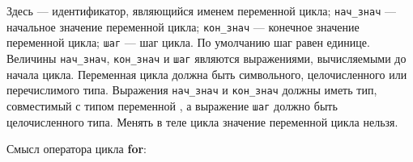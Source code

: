 \documentclass[10pt]{report}
\begin{document}
Здесь \textcolor{Green}{} --- идентификатор, являющийся именем переменной цикла; \texttt{нач_знач} --- начальное значение переменной цикла;
\texttt{кон_знач} --- конечное значение переменной цикла; \texttt{шаг} --- шаг цикла. По умолчанию шаг равен единице. Величины \texttt{нач_знач}, \texttt{кон_знач} и
\texttt{шаг} являются выражениями, вычисляемыми до начала цикла. Переменная цикла должна быть символьного, целочисленного или перечислимого типа. Выражения \texttt{нач_знач} и
\texttt{кон_знач} должны иметь тип, совместимый с типом переменной \textcolor{Green}{}, а выражение \texttt{шаг} должно быть целочисленного типа.
Менять в теле цикла значение переменной цикла нельзя.

Смысл оператора цикла \textbf{\glqq for\grqq}:

\noindent\textcolor{Green}{}
\end{document}
